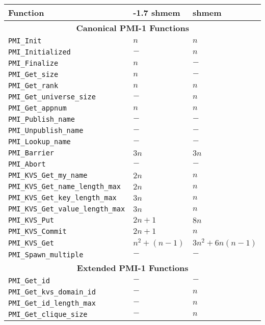 \begin{table}
\centering
\begin{tabular}{|p{8cm}|p{3.5cm}|p{3cm}|}\hline
\textbf{Function} & \textbf{\mvapich2-1.7 shmem} & \textbf{\openmpi-1.6 shmem}\\
\hline
\multicolumn{3}{|c|}{\textbf{Canonical PMI-1 Functions}}\\
\hline
{\tt  PMI\_Init} & $n$ & $n$\\
\hline
{\tt  PMI\_Initialized} & $-$ & $n$\\
\hline
{\tt  PMI\_Finalize} & $n$ & $-$\\
\hline
{\tt  PMI\_Get\_size} & $n$ & $-$\\
\hline
{\tt  PMI\_Get\_rank} & $n$ & $n$\\
\hline
{\tt  PMI\_Get\_universe\_size} & $-$ & $n$\\
\hline
{\tt  PMI\_Get\_appnum} & $n$ & $n$\\
\hline
{\tt  PMI\_Publish\_name} & $-$ & $-$\\
\hline
{\tt  PMI\_Unpublish\_name} & $-$ & $-$\\
\hline
{\tt  PMI\_Lookup\_name} & $-$ & $-$\\
\hline
{\tt  PMI\_Barrier} & $3n$ & $3n$ \\
\hline
{\tt  PMI\_Abort} & $-$ & $-$\\
\hline
{\tt  PMI\_KVS\_Get\_my\_name} & $2n$ & $n$\\
\hline
{\tt  PMI\_KVS\_Get\_name\_length\_max} & $2n$ & $n$\\
\hline
{\tt  PMI\_KVS\_Get\_key\_length\_max} & $3n$ & $n$\\
\hline
{\tt  PMI\_KVS\_Get\_value\_length\_max} & $3n$ & $n$\\
\hline
{\tt  PMI\_KVS\_Put} & $2n + 1$ & $8n$\\
\hline
{\tt  PMI\_KVS\_Commit} & $2n + 1$ & $n$\\
\hline
{\tt  PMI\_KVS\_Get} & $n^2 + (n - 1)$ & $3n^2 + 6n(n - 1)$ \\
\hline
{\tt  PMI\_Spawn\_multiple} & $-$ & $-$ \\
\hline
\multicolumn{3}{|c|}{\textbf{Extended PMI-1 Functions}}\\
\hline
{\tt  PMI\_Get\_id} & $-$ & $-$ \\
\hline
{\tt  PMI\_Get\_kvs\_domain\_id} & $-$ & $n$ \\
\hline
{\tt  PMI\_Get\_id\_length\_max} & $-$ & $n$ \\
\hline
{\tt  PMI\_Get\_clique\_size} & $-$ & $n$ \\

\end{tabular}
\end{table}
